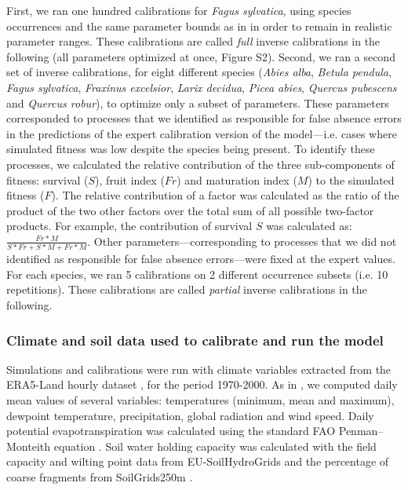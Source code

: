 \documentclass[preprint,12pt,authoryear]{elsarticle}
\begin{document}
First, we ran one hundred calibrations for \emph{Fagus sylvatica}, using species occurrences and the same parameter bounds as in \citet{VanderMeersch2023} in order to remain in realistic parameter ranges. These calibrations are called \emph{full} inverse calibrations in the following (all parameters optimized at once, Figure S2). Second, we ran a second set of inverse calibrations, for eight different species (\emph{Abies alba}, \emph{Betula pendula}, \emph{Fagus sylvatica}, \emph{Fraxinus excelsior}, \emph{Larix decidua}, \emph{Picea abies}, \emph{Quercus pubescens} and \emph{Quercus robur}), to optimize only a subset of parameters. These parameters corresponded to processes that we identified as responsible for false absence errors in the predictions of the expert calibration version of the model---i.e. cases where simulated fitness was low despite the species being present. To identify these processes, we calculated the relative contribution of the three sub-components of fitness: survival ($S$), fruit index ($Fr$) and maturation index ($M$) to the simulated fitness ($F$). The relative contribution of a factor was calculated as the ratio of the product of the two other factors over the total sum of all possible two-factor products. For example, the contribution of survival $S$ was calculated as: $\frac{Fr*M}{S*Fr+S*M+Fr*M}$. Other parameters---corresponding to processes that we did not identified as responsible for false absence errors---were fixed at the expert values. For each species, we ran 5 calibrations on 2 different occurrence subsets (i.e. 10 repetitions). These calibrations are called \emph{partial} inverse calibrations in the following. 

\subsubsection{Climate and soil data used to calibrate and run the model}

Simulations and calibrations were run with climate variables extracted from the ERA5-Land hourly dataset \citep{MunozSabater2021}, for the period 1970-2000. As in \citet{VanderMeersch2023}, we computed daily mean values of several variables: temperatures (minimum, mean and maximum), dewpoint temperature, precipitation, global radiation and wind speed. Daily potential evapotranspiration was calculated using the standard FAO Penman–Monteith equation \citep{Allen1998}. Soil water holding capacity was calculated with the field capacity and wilting point data from EU-SoilHydroGrids \citep{Toth2017} and the percentage of coarse fragments from SoilGrids250m \citep{Hengl2017}.
\end{document}

